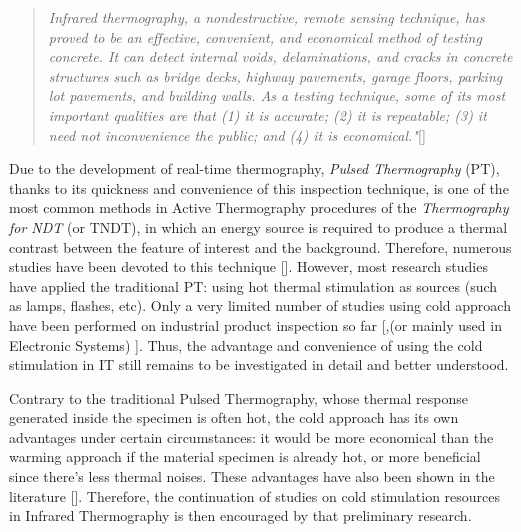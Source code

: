 \begin{quote}
	\textit{	Infrared thermography, a nondestructive, remote sensing technique, has proved to be an effective, convenient, and economical method of testing concrete. It can detect internal voids, delaminations, and cracks in concrete structures such as bridge decks, highway pavements, garage floors, parking lot pavements, and building walls. As a testing technique, some of its most important qualities are that (1) it is accurate; (2) it is repeatable; (3) it need not inconvenience the public; and (4) it is economical."}[\citep{malhotra2004handbook}]
\end{quote} 

Due to the development of real-time thermography, \textit{Pulsed Thermography} (PT), thanks to its quickness and convenience of this inspection technique, is one of the most common methods in Active Thermography procedures of the \textit{Thermography for NDT} (or TNDT), in which an energy source is required to produce a thermal contrast between the feature of interest and the background.  Therefore, numerous studies have been devoted to this technique [\citep{Mayr2011active,Maldague1993Nondestructive,Maldague1994bInfra,Maldague2002intro,Maldague2004Double,2007-Ibarra-Castanedo,2011-ClementeIbarra-Castanedo,2007-ClementeIbarra-Castanedo,shoja2011inspection,duan2013quantitative,vahiddefect2014}]. However, most research studies have applied the traditional PT: using hot thermal stimulation as sources (such as lamps, flashes, etc). Only a very limited number of studies using cold approach have been performed on industrial product inspection so far [\citep{Maldague1993Nondestructive,Maldague1994bInfra,endohdynamical2012},(or mainly used in Electronic Systems) \citep{2012-LewisHom}]. Thus, the advantage and convenience of using the cold stimulation in IT still remains to be investigated in detail and better understood.

Contrary to the traditional Pulsed Thermography, whose thermal response generated inside the specimen is often hot, the cold approach has its own advantages under certain circumstances: it would be more economical than the warming approach if the material specimen is already hot, or more beneficial since there's less thermal noises. These advantages have also been shown in the literature [\citep{Maldague1993Nondestructive,Maldague1994bInfra,endohdynamical2012}]. Therefore, the continuation of studies on cold stimulation resources in Infrared Thermography is then encouraged by that preliminary research.